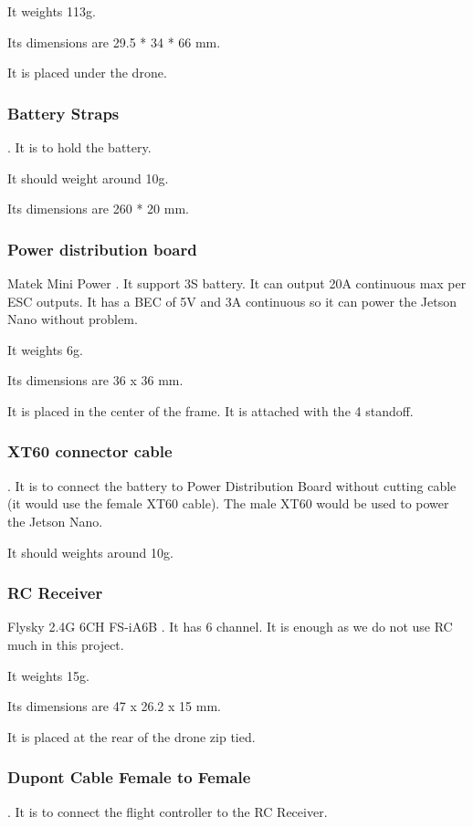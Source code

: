 It weights 113g.

Its dimensions are 29.5 * 34 * 66 mm.

It is placed under the drone.

\subsubsection{Battery Straps}
\cite{bangood_battery_strap}. It is to hold the battery.

It should weight around 10g.

Its dimensions are 260 * 20 mm.

\subsubsection{Power distribution board}
Matek Mini Power \cite{bangood_pdb}. It support 3S battery. It can output 20A continuous max per ESC outputs. It has a BEC of 5V and 3A continuous so it can power the Jetson Nano without problem.

It weights 6g.

Its dimensions are 36 x 36 mm.

It is placed in the center of the frame. It is attached with the 4 standoff.

\subsubsection{XT60 connector cable}
\cite{bangood_xt60_cable}. It is to connect the battery to Power Distribution Board without cutting cable (it would use the female XT60 cable). The male XT60 would be used to power the Jetson Nano.

It should weights around 10g.

\subsubsection{RC Receiver}
Flysky 2.4G 6CH FS-iA6B \cite{bangood_receiver}. It has 6 channel. It is enough as we do not use RC much in this project.

It weights 15g.

Its dimensions are 47 x 26.2 x 15 mm.

It is placed at the rear of the drone zip tied.

\subsubsection{Dupont Cable Female to Female}
\cite{bangood_dupont_cable}. It is to connect the flight controller to the RC Receiver.

